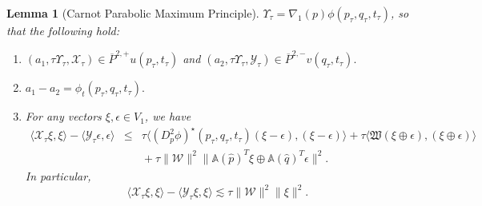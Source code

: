 \documentclass[12pt]{amsart}
\newtheorem{lemma}[thm]{Lemma}
\theoremstyle{definition}
\theoremstyle{remark}
\numberwithin{equation}{section}
\begin{document}
\begin{lemma}[Carnot Parabolic Maximum Principle]
$\Upsilon_{\tau}=\nabla_{1}(p)\phi(p_{\tau}, q_{\tau}, t_\tau)$, 
so that the following hold:
\begin{enumerate}
\item [A)]  $(a_1,\tau \Upsilon_{\tau},\mathcal{X}_{\tau}) \in \overline{P}^{2,+}u(p_\tau,t_\tau)$ and $(a_2,\tau \Upsilon_{\tau},\mathcal{Y}_{\tau}) \in \overline{P}^{2,-}v(q_\tau,t_\tau).$
\item [B)] $a_1-a_2=\phi_t(p_\tau, q_\tau, t_\tau).$
\item [C)] For any vectors $\xi, \epsilon \in V_1$, we have 
\begin{eqnarray}
 {\ensuremath{\langle {\mathcal{X}_{\tau}\xi} , {\xi} \rangle}} - {\ensuremath{\langle {\mathcal{Y}_{\tau}\epsilon} , {\epsilon} \rangle}} & \leq & 
\tau {\ensuremath{\langle {(D^2_p\phi)^\star(p_\tau, q_{\tau}, t_\tau) (\xi-\epsilon)} , {(\xi-\epsilon)} \rangle}}+\tau{\ensuremath{\langle {\mathfrak{W}(\xi\oplus\epsilon)} , {(\xi\oplus\epsilon)} \rangle}}\nonumber\\ 
& & \mbox{}+\tau \|\mathcal{W}\|^2\|\mathbb{A}(\hat{p})^T\xi\oplus\mathbb{A}(\hat{q})^T\epsilon\|^2. \label{fake}
\end{eqnarray}
In particular, 
 \begin{equation}
 {\ensuremath{\langle {\mathcal{X}_{\tau}\xi} , {\xi} \rangle}} - {\ensuremath{\langle {\mathcal{Y}_{\tau}\xi} , {\xi} \rangle}}\lesssim 
\tau \|\mathcal{W}\|^2\|\xi\|^2.\label{real}
\end{equation}
\end{enumerate}
\end{lemma}
\end{document}

